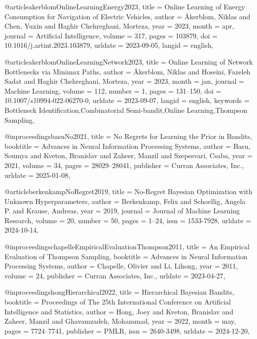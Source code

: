 @article{akerblomOnlineLearningEnergy2023,
  title = {Online Learning of Energy Consumption for Navigation of Electric Vehicles},
  author = {{\AA}kerblom, Niklas and Chen, Yuxin and Haghir Chehreghani, Morteza},
  year = {2023},
  month = apr,
  journal = {Artificial Intelligence},
  volume = {317},
  pages = {103879},
  doi = {10.1016/j.artint.2023.103879},
  urldate = {2023-09-05},
  langid = {english},
}

@article{akerblomOnlineLearningNetwork2023,
  title = {Online Learning of Network Bottlenecks via Minimax Paths},
  author = {{\AA}kerblom, Niklas and Hoseini, Fazeleh Sadat and Haghir Chehreghani, Morteza},
  year = {2023},
  month = jan,
  journal = {Machine Learning},
  volume = {112},
  number = {1},
  pages = {131--150},
  doi = {10.1007/s10994-022-06270-0},
  urldate = {2023-09-07},
  langid = {english},
  keywords = {Bottleneck Identification,Combinatorial Semi-bandit,Online Learning,Thompson Sampling},
}

@inproceedings{basuNo2021,
  title = {No {{Regrets}} for {{Learning}} the {{Prior}} in {{Bandits}}},
  booktitle = {Advances in {{Neural Information Processing Systems}}},
  author = {Basu, Soumya and Kveton, Branislav and Zaheer, Manzil and Szepesvari, Csaba},
  year = {2021},
  volume = {34},
  pages = {28029--28041},
  publisher = {Curran Associates, Inc.},
  urldate = {2025-01-08},
}

@article{berkenkampNoRegret2019,
  title = {No-{{Regret Bayesian Optimization}} with {{Unknown Hyperparameters}}},
  author = {Berkenkamp, Felix and Schoellig, Angela P. and Krause, Andreas},
  year = {2019},
  journal = {Journal of Machine Learning Research},
  volume = {20},
  number = {50},
  pages = {1--24},
  issn = {1533-7928},
  urldate = {2024-10-14},
}

@inproceedings{chapelleEmpiricalEvaluationThompson2011,
  title = {An {{Empirical Evaluation}} of {{Thompson Sampling}}},
  booktitle = {Advances in {{Neural Information Processing Systems}}},
  author = {Chapelle, Olivier and Li, Lihong},
  year = {2011},
  volume = {24},
  publisher = {Curran Associates, Inc.},
  urldate = {2023-04-27},
}


@inproceedings{hongHierarchical2022,
  title = {Hierarchical {{Bayesian Bandits}}},
  booktitle = {Proceedings of {{The}} 25th {{International Conference}} on {{Artificial Intelligence}} and {{Statistics}}},
  author = {Hong, Joey and Kveton, Branislav and Zaheer, Manzil and Ghavamzadeh, Mohammad},
  year = {2022},
  month = may,
  pages = {7724--7741},
  publisher = {PMLR},
  issn = {2640-3498},
  urldate = {2024-12-20},
}

